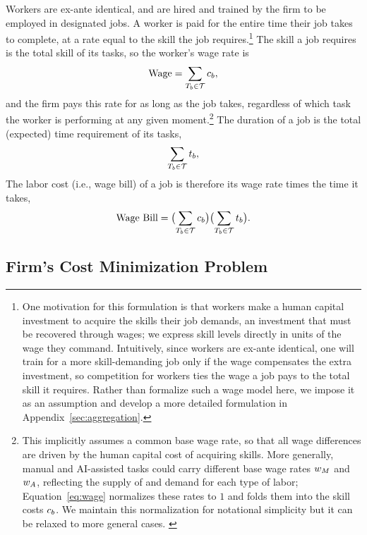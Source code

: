 Workers are ex-ante identical, and are hired and trained by the firm to be employed in designated jobs.
A worker is paid for the entire time their job takes to complete, at a rate equal to the skill the job requires.\footnote{
One motivation for this formulation is that workers make a human capital investment to acquire the skills their job demands, an investment that must be recovered through wages; we express skill levels directly in units of the wage they command.
Intuitively, since workers are ex-ante identical, one will train for a more skill-demanding job only if the wage compensates the extra investment, so competition for workers ties the wage a job pays to the total skill it requires.
Rather than formalize such a wage model here, we impose it as an assumption and develop a more detailed formulation in Appendix~\ref{sec:aggregation}.
}
The skill a job requires is the total skill of its tasks, so the worker's wage rate is
\begin{align}
\label{eq:wage}
\text{Wage} = \sum_{T_b \in \mathcal{T}} c_{b},
\end{align}
and the firm pays this rate for as long as the job takes, regardless of which task the worker is performing at any given moment.\footnote{
This implicitly assumes a common base wage rate, so that all wage differences are driven by the human capital cost of acquiring skills.
More generally, manual and AI-assisted tasks could carry different base wage rates $w_{M}$ and $w_{A}$, reflecting the supply of and demand for each type of labor; Equation~\eqref{eq:wage} normalizes these rates to $1$ and folds them into the skill costs $c_{b}$.
We maintain this normalization for notational simplicity but it can be relaxed to more general cases.
\label{foot:wage}
}
The duration of a job is the total (expected) time requirement of its tasks,
\begin{align*}
\sum_{T_b \in \mathcal{T}} t_{b},
\end{align*}
The labor cost (i.e., wage bill) of a job is therefore its wage rate times the time it takes,
\begin{align*}
\text{Wage Bill} = \bigl(\sum_{T_b \in \mathcal{T}} c_{b}\bigr)\bigl(\sum_{T_b \in \mathcal{T}} t_{b}\bigr).
\end{align*}




\subsection{Firm's Cost Minimization Problem}
\label{sec:model.jobs}

